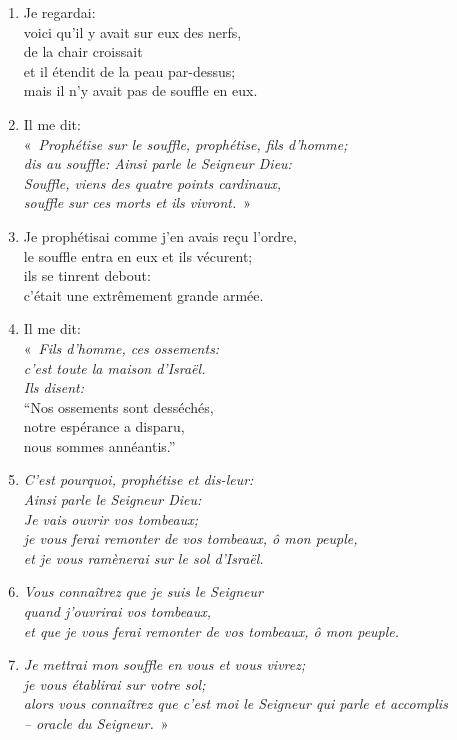\begin{enumerate}[leftmargin=\psleftmargin, labelsep = \pslabelsep, label={\arabic*}, font=\color{\pscolor}\small\textsuperscript, parsep=0em, itemsep=0em, topsep=0em ]
    \item Je regardai: \\ voici qu’il y avait sur eux des nerfs, \\ de la chair croissait \\ et il étendit de la peau par-dessus; \\ mais il n’y avait pas de souffle en eux.\verseSpace
    \item Il me dit: \\ \decalage «~\textit{Prophétise sur le souffle, prophétise, fils d’homme; \\ \decalage dis au souffle: Ainsi parle le Seigneur Dieu: \\ \decalage Souffle, viens des quatre points cardinaux, \\ \decalage souffle sur ces morts et ils vivront.}~»
    \item Je prophétisai comme j’en avais reçu l’ordre, \\ le souffle entra en eux et ils vécurent; \\ ils se tinrent debout: \\ c’était une extrêmement grande armée.\newpage
    \item Il me dit: \\ \decalage «~\textit{Fils d’homme, ces ossements: \\ \decalage c’est toute la maison d’Israël. \\ \decalage Ils disent:} \\
    \decalage \decalage “Nos ossements sont desséchés,  \\ \decalage \decalage notre espérance a disparu, \\ \decalage \decalage nous sommes annéantis.”
    \item \decalage \textit{C’est pourquoi, prophétise et dis-leur: \\ \decalage \decalage Ainsi parle le Seigneur Dieu: \\
    \decalage \decalage Je vais ouvrir vos tombeaux; \\ \decalage \decalage je vous ferai remonter de vos tombeaux, ô mon peuple, \\
    \decalage \decalage et je vous ramènerai sur le sol d’Israël.}
    \item \decalage \decalage \textit{Vous connaîtrez que je suis le Seigneur \\ \decalage \decalage quand j’ouvrirai vos tombeaux, \\ \decalage \decalage et que je vous ferai remonter de vos tombeaux, ô mon peuple.}
    \item \decalage \decalage \textit{Je mettrai mon souffle en vous et vous vivrez; \\ \decalage \decalage je vous établirai sur votre sol; \\
    \decalage \decalage alors vous connaîtrez que c’est moi le Seigneur qui parle et accomplis \\ \decalage \decalage – oracle du Seigneur.}~»\parSpace

\end{enumerate}
